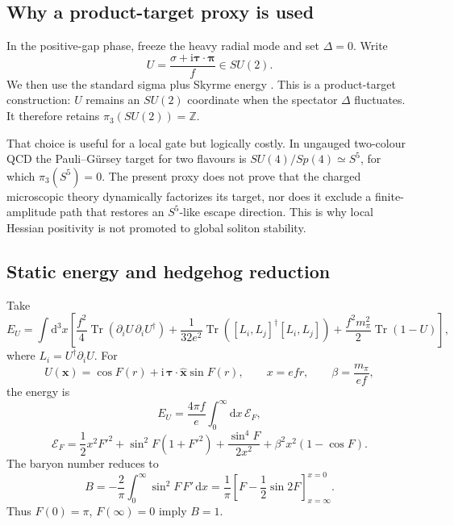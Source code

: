 \documentclass[11pt]{article}
\theoremstyle{definition}
\theoremstyle{remark}
\newcommand{\dd}{\mathrm d}
\newcommand{\ii}{\mathrm i}
\newcommand{\Tr}{\operatorname{Tr}}
\newcommand{\cE}{\mathcal E}
\newcommand{\ZZ}{\mathbb Z}
\begin{document}
\subsection{Why a product-target proxy is used}

In the positive-gap phase, freeze the heavy radial mode and set
\(\Delta=0\).  Write
\begin{equation}
 U=\frac{\sigma+\ii\bm\tau\cdot\bm\pi}{f}\in SU(2).
\end{equation}
We then use the standard sigma plus Skyrme energy
\cite{Skyrme1961,AdkinsNappiWitten1983}.  This is a product-target
construction: \(U\) remains an \(SU(2)\) coordinate when the spectator
\(\Delta\) fluctuates.  It therefore retains
\(\pi_3(SU(2))=\ZZ\).

That choice is useful for a local gate but logically costly.  In ungauged
two-colour QCD the Pauli--G\"ursey target for two flavours is
\(SU(4)/Sp(4)\simeq S^5\), for which \(\pi_3(S^5)=0\).  The present proxy
does not prove that the charged microscopic theory dynamically factorizes
its target, nor does it exclude a finite-amplitude path that restores an
\(S^5\)-like escape direction.  This is why local Hessian positivity is not
promoted to global soliton stability.

\subsection{Static energy and hedgehog reduction}

Take
\begin{equation}
 E_U=\int\dd^3x\left[
 \frac{f^2}{4}\Tr(\partial_iU\,\partial_iU^\dagger)
 +\frac{1}{32e^2}\Tr\!\left([L_i,L_j]^\dagger[L_i,L_j]\right)
 +\frac{f^2m_\pi^2}{2}\Tr(1-U)\right],
 \label{eq:skyrme-energy}
\end{equation}
where \(L_i=U^\dagger\partial_iU\).  For
\begin{equation}
 U(\bm x)=\cos F(r)+\ii\,\bm\tau\cdot\widehat{\bm x}\sin F(r),
 \qquad x=efr,\qquad \beta=\frac{m_\pi}{ef},
 \label{eq:hedgehog}
\end{equation}
the energy is
\begin{equation}
 E_U=\frac{4\pi f}{e}\int_0^\infty\dd x\,\cE_F,
 \label{eq:radial-energy}
\end{equation}
\begin{equation}
 \cE_F=
 \frac12x^2F'^2+\sin^2F(1+F'^2)
 +\frac{\sin^4F}{2x^2}
 +\beta^2x^2(1-\cos F).
 \label{eq:radial-density}
\end{equation}
The baryon number reduces to
\begin{equation}
 B=-\frac2\pi\int_0^\infty\sin^2F\,F'\,\dd x
 =\frac1\pi\left[F-\frac12\sin2F\right]_{x=\infty}^{x=0}.
 \label{eq:baryon-number}
\end{equation}
Thus \(F(0)=\pi\), \(F(\infty)=0\) imply \(B=1\).
\end{document}
